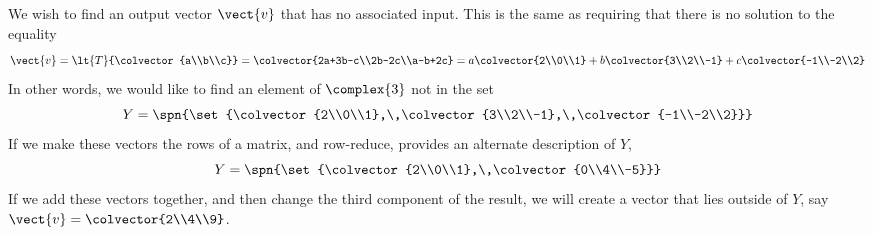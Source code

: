 We wish to find an output vector $\vect{v}$ that has no associated input.  This is the same as requiring that there is no solution to the equality
%
\begin{equation*}
\vect{v}=\lt{T}{\colvector{a\\b\\c}}=\colvector{2a+3b-c\\2b-2c\\a-b+2c}
=a\colvector{2\\0\\1}+b\colvector{3\\2\\-1}+c\colvector{-1\\-2\\2}
\end{equation*}
%
In other words, we would like to find an element of $\complex{3}$ not in the set
%
\begin{equation*}
Y=\spn{\set{\colvector{2\\0\\1},\,\colvector{3\\2\\-1},\,\colvector{-1\\-2\\2}}}
\end{equation*}
%
If we make these vectors the rows of a matrix, and row-reduce,  provides an alternate description of $Y$,
%
\begin{equation*}
Y=\spn{\set{\colvector{2\\0\\1},\,\colvector{0\\4\\-5}}}
\end{equation*}
%
If we add these vectors together, and then change the third component of the result, we will create a vector that lies outside of $Y$, say $\vect{v}=\colvector{2\\4\\9}$.
